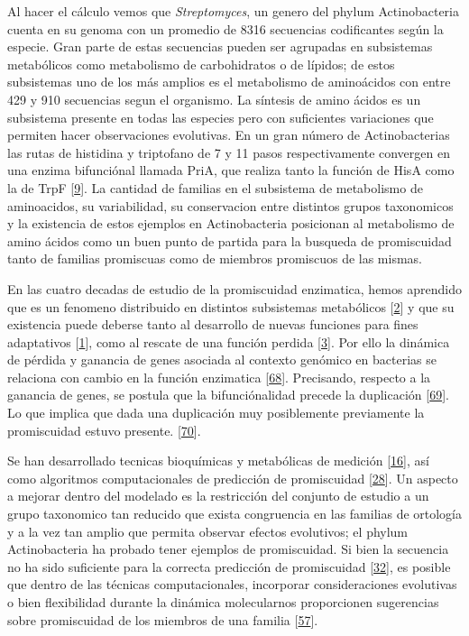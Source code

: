 \documentclass[12pt,twoside]{reedthesis}
\begin{document}
  Al hacer el cálculo vemos que \emph{Streptomyces}, un genero del phylum
  Actinobacteria cuenta en su genoma con un promedio de 8316 secuencias
  codificantes según la especie. Gran parte de estas secuencias pueden ser
  agrupadas en subsistemas metabólicos como metabolismo de carbohidratos o
  de lípidos; de estos subsistemas uno de los más amplios es el
  metabolismo de aminoácidos con entre 429 y 910 secuencias segun el
  organismo. La síntesis de amino ácidos es un subsistema presente en
  todas las especies pero con suficientes variaciones que permiten hacer
  observaciones evolutivas. En un gran número de Actinobacterias las rutas
  de histidina y triptofano de 7 y 11 pasos respectivamente convergen en
  una enzima bifunciónal llamada PriA, que realiza tanto la función de
  HisA como la de TrpF
  {[}\protect\hyperlink{ref-baronagomez_occurrence_2003}{9}{]}. La
  cantidad de familias en el subsistema de metabolismo de aminoacidos, su
  variabilidad, su conservacion entre distintos grupos taxonomicos y la
  existencia de estos ejemplos en Actinobacteria posicionan al metabolismo
  de amino ácidos como un buen punto de partida para la busqueda de
  promiscuidad tanto de familias promiscuas como de miembros promiscuos de
  las mismas.
  
  En las cuatro decadas de estudio de la promiscuidad enzimatica, hemos
  aprendido que es un fenomeno distribuido en distintos subsistemas
  metabólicos {[}\protect\hyperlink{ref-nam_network_2012}{2}{]} y que su
  existencia puede deberse tanto al desarrollo de nuevas funciones para
  fines adaptativos {[}\protect\hyperlink{ref-jensen_enzyme_1976}{1}{]},
  como al rescate de una función perdida
  {[}\protect\hyperlink{ref-patrick_multicopy_2007}{3}{]}. Por ello la
  dinámica de pérdida y ganancia de genes asociada al contexto genómico en
  bacterias se relaciona con cambio en la función enzimatica
  {[}\protect\hyperlink{ref-zhao_discovery_2013}{68}{]}. Precisando,
  respecto a la ganancia de genes, se postula que la bifunciónalidad
  precede la duplicación
  {[}\protect\hyperlink{ref-hughes_evolution_1994}{69}{]}. Lo que implica
  que dada una duplicación muy posiblemente previamente la promiscuidad
  estuvo presente. {[}\protect\hyperlink{ref-gerlt_divergent_2001}{70}{]}.
  
  Se han desarrollado tecnicas bioquímicas y metabólicas de medición
  {[}\protect\hyperlink{ref-nath_quantitative_2008}{16}{]}, así como
  algoritmos computacionales de predicción de promiscuidad
  {[}\protect\hyperlink{ref-carbonell_molecular_2010}{28}{]}. Un aspecto a
  mejorar dentro del modelado es la restricción del conjunto de estudio a
  un grupo taxonomico tan reducido que exista congruencia en las familias
  de ortología y a la vez tan amplio que permita observar efectos
  evolutivos; el phylum Actinobacteria ha probado tener ejemplos de
  promiscuidad. Si bien la secuencia no ha sido suficiente para la
  correcta predicción de promiscuidad
  {[}\protect\hyperlink{ref-verdel-aranda_molecular_2015}{32}{]}, es
  posible que dentro de las técnicas computacionales, incorporar
  consideraciones evolutivas o bien flexibilidad durante la dinámica
  molecularnos proporcionen sugerencias sobre promiscuidad de los miembros
  de una familia
  {[}\protect\hyperlink{ref-james_conformational_2003}{57}{]}.
  
\end{document}
